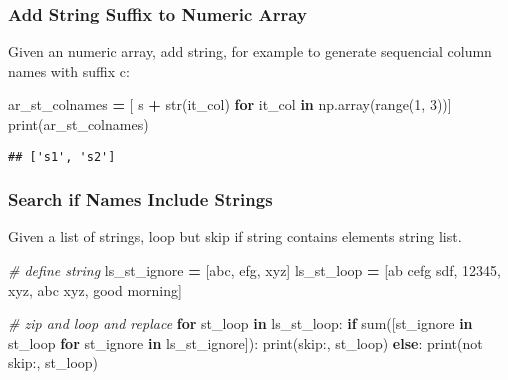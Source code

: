 \documentclass[
]{book}
\newenvironment{Shaded}{\begin{snugshade}}{\end{snugshade}}
\newcommand{\BuiltInTok}[1]{#1}
\newcommand{\CommentTok}[1]{\textcolor[rgb]{0.56,0.35,0.01}{\textit{#1}}}
\newcommand{\ControlFlowTok}[1]{\textcolor[rgb]{0.13,0.29,0.53}{\textbf{#1}}}
\newcommand{\DecValTok}[1]{\textcolor[rgb]{0.00,0.00,0.81}{#1}}
\newcommand{\KeywordTok}[1]{\textcolor[rgb]{0.13,0.29,0.53}{\textbf{#1}}}
\newcommand{\NormalTok}[1]{#1}
\newcommand{\OperatorTok}[1]{\textcolor[rgb]{0.81,0.36,0.00}{\textbf{#1}}}
\newcommand{\StringTok}[1]{\textcolor[rgb]{0.31,0.60,0.02}{#1}}
\begin{document}
\hypertarget{add-string-suffix-to-numeric-array}{%
\subsubsection{Add String Suffix to Numeric Array}\label{add-string-suffix-to-numeric-array}}

Given an numeric array, add string, for example to generate sequencial column names with suffix c:

\begin{Shaded}
\begin{Highlighting}[]
\NormalTok{ar\_st\_colnames }\OperatorTok{=}\NormalTok{ [ }\StringTok{\textquotesingle{}s\textquotesingle{}} \OperatorTok{+} \BuiltInTok{str}\NormalTok{(it\_col) }\ControlFlowTok{for}\NormalTok{ it\_col }\KeywordTok{in}\NormalTok{ np.array(}\BuiltInTok{range}\NormalTok{(}\DecValTok{1}\NormalTok{, }\DecValTok{3}\NormalTok{))]}
\BuiltInTok{print}\NormalTok{(ar\_st\_colnames)}
\end{Highlighting}
\end{Shaded}

\begin{verbatim}
## ['s1', 's2']
\end{verbatim}

\hypertarget{search-if-names-include-strings}{%
\subsubsection{Search if Names Include Strings}\label{search-if-names-include-strings}}

Given a list of strings, loop but skip if string contains elements string list.

\begin{Shaded}
\begin{Highlighting}[]
\CommentTok{\# define string}
\NormalTok{ls\_st\_ignore }\OperatorTok{=}\NormalTok{ [}\StringTok{\textquotesingle{}abc\textquotesingle{}}\NormalTok{, }\StringTok{\textquotesingle{}efg\textquotesingle{}}\NormalTok{, }\StringTok{\textquotesingle{}xyz\textquotesingle{}}\NormalTok{]}
\NormalTok{ls\_st\_loop }\OperatorTok{=}\NormalTok{ [}\StringTok{\textquotesingle{}ab cefg sdf\textquotesingle{}}\NormalTok{, }\StringTok{\textquotesingle{}12345\textquotesingle{}}\NormalTok{, }\StringTok{\textquotesingle{}xyz\textquotesingle{}}\NormalTok{, }\StringTok{\textquotesingle{}abc xyz\textquotesingle{}}\NormalTok{, }\StringTok{\textquotesingle{}good morning\textquotesingle{}}\NormalTok{]}

\CommentTok{\# zip and loop and replace}
\ControlFlowTok{for}\NormalTok{ st\_loop }\KeywordTok{in}\NormalTok{ ls\_st\_loop:}
  \ControlFlowTok{if} \BuiltInTok{sum}\NormalTok{([st\_ignore }\KeywordTok{in}\NormalTok{ st\_loop }\ControlFlowTok{for}\NormalTok{ st\_ignore }\KeywordTok{in}\NormalTok{ ls\_st\_ignore]):}
    \BuiltInTok{print}\NormalTok{(}\StringTok{\textquotesingle{}skip:\textquotesingle{}}\NormalTok{, st\_loop)}
  \ControlFlowTok{else}\NormalTok{:}
    \BuiltInTok{print}\NormalTok{(}\StringTok{\textquotesingle{}not skip:\textquotesingle{}}\NormalTok{, st\_loop)}
\end{Highlighting}
\end{Shaded}
\end{document}
